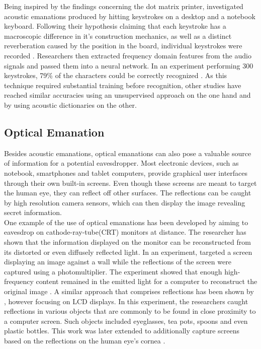 Being inspired by the findings concerning the dot matrix printer, \citeauthor{1301311} investigated acoustic emanations produced by hitting keystrokes on a desktop and a notebook keyboard. Following their hypothesis claiming that each keystroke has a macroscopic difference in it's construction mechanics, as well as a distinct reverberation caused by the position in the board, individual keystrokes were recorded \cite{1301311}. Researchers then extracted frequency domain features from the audio signals and passed them into a neural network. In an experiment performing 300 keystrokes, 79\% of the characters could be correctly recognized \cite{1301311}. As this technique required substantial training before recognition, other studies have reached similar accuracies using an unsupervised approach \cite{Zhuang:2009:KAE:1609956.1609959} on the one hand and by using acoustic dictionaries \cite{Berger:2006:DAU:1180405.1180436} on the other.

\subsection{Optical Emanation}
Besides acoustic emanations, optical emanations can also pose a valuable source of information for a potential eavesdropper. Most electronic devices, such as notebook, smartphones and tablet computers, provide graphical user interfaces through their own built-in screens. Even though these screens are meant to target the human eye, they can reflect off other surfaces. The reflections can be caught by high resolution camera sensors, which can then display the image revealing secret information.\\

One example of the use of optical emanations has been developed by \citeauthor{1004358} aiming to eavesdrop on cathode-ray-tube(CRT) monitors at distance. The researcher has shown that the information displayed on the monitor can be reconstructed from its distorted or even diffusely reflected light. In an experiment, \citeauthor{1004358} targeted a screen displaying an image against a wall while the reflections of the screen were captured using a photomultiplier. The experiment showed that enough high-frequency content remained in the emitted light for a computer to reconstruct the original image \cite{1004358}. A similar approach that comprises reflections has been shown by \citeauthor{4531151}, however focusing on LCD displays. In this experiment, the researchers caught reflections in various objects that are commonly to be found in close proximity to a computer screen. Such objects included eyeglasses, tea pots, spoons and even plastic bottles. This work was later extended to additionally capture screens based on the reflections on the human eye's cornea \cite{5207653}.

